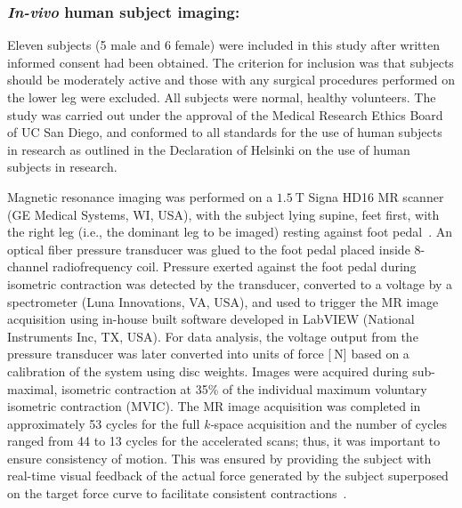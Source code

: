 \subsubsection{\textit{In-vivo} human subject imaging: }
Eleven subjects (5 male and 6 female) were included in this study after written informed consent had been obtained. 
The criterion for inclusion was that subjects should be moderately active and those with any surgical procedures performed on the lower leg were excluded. 
All subjects were normal, healthy volunteers. 
The study was carried out under the approval of the Medical Research Ethics Board of UC San Diego, and conformed to all standards for the use of human subjects in research as outlined in the Declaration of Helsinki on the use of human subjects in research.

Magnetic resonance imaging was performed on a $\SI{1.5}{\tesla}$ Signa HD16 MR scanner (GE Medical Systems, WI, USA), with the subject lying supine, feet first, with the right leg (i.e., the dominant leg to be imaged) resting against foot pedal~\cite{RNSS10}. 
An optical fiber pressure transducer was glued to the foot pedal placed inside 8-channel radiofrequency coil. 
Pressure exerted against the foot pedal during isometric contraction was detected by the transducer, converted to a voltage by a spectrometer (Luna Innovations, VA, USA), and used to trigger the MR image acquisition using in-house built software developed in LabVIEW (National Instruments Inc, TX, USA). 
For data analysis, the voltage output from the pressure transducer was later converted into units of force [$\SI{}{\newton}$] based on a calibration of the system using disc weights. 
Images were acquired during sub-maximal, isometric contraction at 35\% of the individual maximum voluntary isometric contraction (MVIC). 
The MR image acquisition was completed in approximately 53 cycles for the full \mbox{\textit{k-}space} acquisition and the number of cycles ranged from 44 to 13 cycles for the accelerated scans; thus, it was important to ensure consistency of motion. 
This was ensured by providing the subject with real-time visual feedback of the actual force generated by the subject superposed on the target force curve to facilitate consistent contractions~\cite{Malis:2018fr}.
